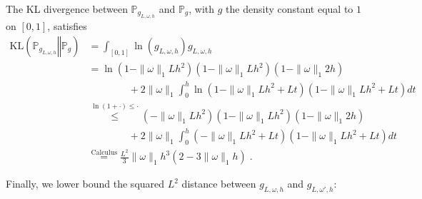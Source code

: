 \documentclass[10pt]{article} %
\newcommand{\Prob}[0]{\mathbb{P}}
\newcommand\kl[2]{\mathrm{KL}\left( \left. {#1}\right\Vert {#2} \right)}
\newcommand\p[1]{\left( {#1}\right)}
\newcommand\RG[1]{\textcolor{red}{#1}}
\newcommand\mRG[1]{\marginpar{\tiny\RG{#1}}}
\newcommand\CL[1]{\textcolor{blue}{#1}}
\begin{document}
The KL divergence between $\Prob_{g_{L, \omega, h}}$ and $\Prob_g$,
with $g$ the density constant equal to $1$ on $[0, 1]$, satisfies
\begin{equation}
\label{eq:klsaw}
    \begin{aligned}
    \kl{\Prob_{g_{L, \omega, h}}}{\Prob_g}
    &= 
    \int_{[0, 1]} \ln\p{g_{L, \omega, h}} g_{L, \omega, h} \\
    &=
    \ln \p{1 - \|\omega\|_1Lh^2} \p{1 - \|\omega\|_1Lh^2} \p{1 - \|\omega\|_1 2h } \\
    &\quad\quad\quad\quad+
    2 \|\omega\|_1 \int_{0}^h \ln \p{1 - \|\omega\|_1 Lh^2 + Lt} \p{1 - \|\omega\|_1 Lh^2 + Lt} dt \\
    &\stackrel{\ln (1 + \cdot) \leq \cdot}{\leq }
   \p{- \|\omega\|_1Lh^2} \p{1 -\|\omega\|_1 Lh^2} \p{1 - \|\omega\|_1 2h } \\
   &\quad\quad\quad\quad+
    2 \|\omega\|_1 \int_{0}^h \p{ - \|\omega\|_1 Lh^2 + Lt} \p{1 - \|\omega\|_1 Lh^2 + Lt} dt \\
    &\stackrel{\text{Calculus}}{=} \frac{L^2}{3} \|\omega\|_1 h^3 (2 - 3 \|\omega\|_1 h) \;.
    \end{aligned} 
\end{equation}

Finally, we lower bound the squared $L^2$ distance between $g_{L, \omega, h}$ and $g_{L, \omega', h}$:
\end{document}
